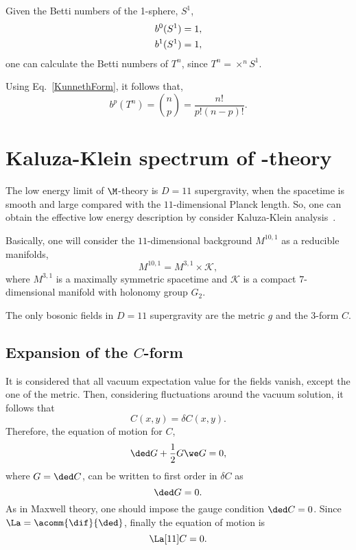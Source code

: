 \begin{WEbox}[frametitle={Betti numbers of a torus ($T^n$)},
  frametitlerule=true,
  frametitlealignment=\centering,
  frametitleaboveskip=10pt,]
  Given the Betti numbers of the 1-sphere, $S^1$,
  \begin{equation}
    \begin{split}      
      b^0(S^1) &= 1, \notag \\
      b^1(S^1) &= 1,
    \end{split}
  \end{equation}
  one can calculate the Betti numbers of $T^n$, since $T^n = \times ^n S^1$.

  Using Eq.~\eqref{KunnethForm}, it follows that,
  \begin{equation}
    b^p(T^n) = \binom{n}{p} = \frac{n!}{p!(n-p)!}.
  \end{equation}
\end{WEbox}


\section{Kaluza-Klein spectrum of \M-theory}

The low energy limit of $\M$-theory is $D = 11$ supergravity, when  the spacetime is smooth and large compared with the $11$-dimensional Planck length. So, one can obtain the effective low energy description by consider Kaluza-Klein analysis~\cite{Papadopoulos:1995da,Acharya:2004qe}. 

Basically, one will consider the $11$-dimensional background $M^{10,1}$ as a reducible manifolds, $$M^{10,1} = M^{3,1} \times \mathcal{K},$$ where $M^{3,1}$ is a maximally symmetric spacetime and $\mathcal{K}$ is a compact $7$-dimensional manifold with holonomy group $G_2$.

The only bosonic fields in $D = 11$ supergravity are the metric $g$ and the $3$-form $C$. 

\subsection{Expansion of the $C$-form}

It is  considered that all vacuum expectation value for  the fields vanish, except the one of the metric. Then, considering fluctuations around the vacuum solution, it follows that
\begin{equation}
  C(x,y) = \delta C(x,y).
\end{equation}
Therefore, the equation of motion for $C$, 
\begin{equation}
  \ded G + \frac{1}{2} G \we G = 0,
  \label{eq:C}
\end{equation}
where $G = \ded C$, can be written to first order in $\delta C$ as
\begin{equation}
  \ded G = 0.
\end{equation}
As in Maxwell theory, one should impose the gauge condition $\ded C = 0$. Since $\La = \acomm{\dif}{\ded}$, finally the equation of motion is
\begin{equation}
  \La[11] C = 0.
\end{equation}


